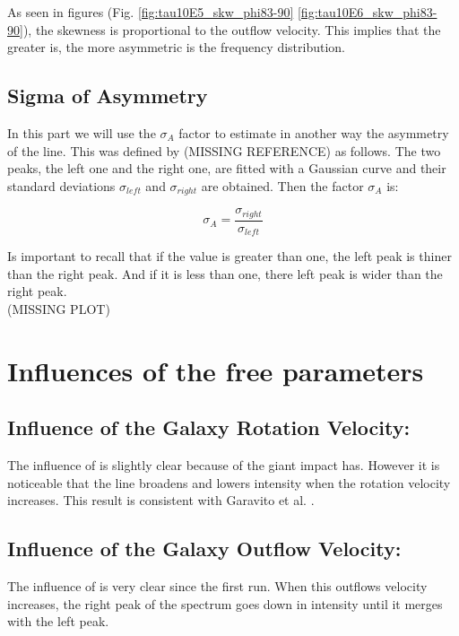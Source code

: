 As seen in figures (Fig. \ref{fig:tau10E5_skw_phi83-90} \ref{fig:tau10E6_skw_phi83-90}), the skewness is proportional to the outflow velocity. This implies that the greater \vout is, the more asymmetric is the \lya frequency distribution.\\

\subsection{Sigma of Asymmetry}
In this part we will use the $\sigma_A$ factor to estimate in another way the asymmetry of the \lya line. This was defined by (MISSING REFERENCE) as follows. The two peaks, the left one and the right one, are fitted with a Gaussian curve and their standard deviations $\sigma_{left}$ and $\sigma_{right}$ are obtained. Then the factor $\sigma_A$ is:

\begin{equation}
\sigma_A = \frac{\sigma_{right}}{\sigma_{left}}
\end{equation}

Is important to recall that if the value is greater than one, the left peak is thiner than the right peak. And if it is less than one, there left peak is wider than the right peak.\\

(MISSING PLOT)


\section{Influences of the free parameters}

\subsection{Influence of the Galaxy Rotation Velocity: \vrot}
The influence of \vrot is slightly clear because of the giant impact \vout has. However it is noticeable that the \lya line broadens and lowers intensity when the rotation velocity increases. This result is consistent with Garavito et al. \cite{Garavito14}. \\

\subsection{Influence of the Galaxy Outflow Velocity: \vout}
The influence of \vout is very clear since the first run. When this outflows velocity increases, the right peak of the spectrum goes down in intensity until it merges with the left peak. \\

